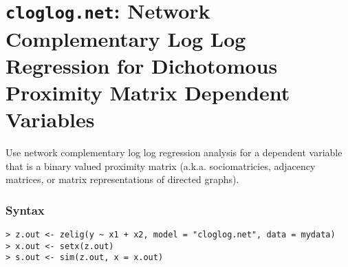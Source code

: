 \section{{\tt cloglog.net}: Network Complementary Log Log Regression for Dichotomous Proximity Matrix Dependent Variables} 
 
Use network complementary log log regression analysis for a dependent variable that is a binary valued proximity matrix (a.k.a. sociomatricies, adjacency matrices, or matrix representations of directed graphs).  
 
\subsubsection{Syntax} 
\begin{verbatim} 
> z.out <- zelig(y ~ x1 + x2, model = "cloglog.net", data = mydata)  
> x.out <- setx(z.out) 
> s.out <- sim(z.out, x = x.out) 
\end{verbatim} 
 
 
